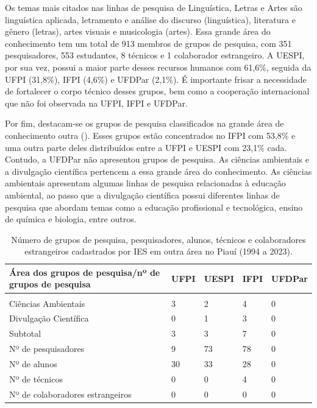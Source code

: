 \documentclass[portuguese]{textolivre}
\begin{document}
Os temas mais citados nas linhas de pesquisa de Linguística, Letras e Artes são linguística aplicada, letramento e análise do discurso (linguística), literatura e gênero (letras), artes visuais e musicologia (artes). Essa grande área do conhecimento tem um total de 913 membros de grupos de pesquisa, com 351 pesquisadores, 553 estudantes, 8 técnicos e 1 colaborador estrangeiro. A UESPI, por sua vez, possui a maior parte desses recursos humanos com 61,6\%, seguida da UFPI (31,8\%), IFPI (4,6\%) e UFDPar (2,1\%). É importante frisar a necessidade de fortalecer o corpo técnico desses grupos, bem como a cooperação internacional que não foi observada na UFPI, IFPI e UFDPar.

Por fim, destacam-se os grupos de pesquisa classificados na grande área de conhecimento outra (). Esses grupos estão concentrados no IFPI com 53,8\% e uma outra parte deles distribuídos entre a UFPI e UESPI com 23,1\% cada. Contudo, a UFDPar não apresentou grupos de pesquisa. As ciências ambientais e a divulgação científica pertencem a essa grande área do conhecimento. As ciências ambientais apresentam algumas linhas de pesquisa relacionadas à educação ambiental, ao passo que a divulgação científica possui diferentes linhas de pesquisa que abordam temas como a educação profissional e tecnológica, ensino de química e biologia, entre outros.

\begin{table}[htbp]
\centering
\begin{threeparttable}
\caption{Número de grupos de pesquisa, pesquisadores, alunos, técnicos e colaboradores estrangeiros cadastrados por IES em outra área no Piauí (1994 a 2023).}
\label{tbl12}
\begin{tabular}{>{\raggedright\arraybackslash}p{5cm} l l l l}
\toprule
Área dos grupos de pesquisa/nº de grupos de pesquisa & UFPI & UESPI & IFPI & UFDPar \\ 
\midrule
\multicolumn{5}{c}{Outra} \\
\midrule
Ciências Ambientais & 3 & 2 & 4 & 0 \\
Divulgação Científica & 0 & 1 & 3 & 0 \\
\midrule
Subtotal & 3 & 3 & 7 & 0 \\
\midrule
Nº de pesquisadores & 9 & 73 & 78 & 0 \\
Nº de alunos & 30 & 33 & 28 & 0 \\
Nº de técnicos & 0 & 0 & 4 & 0 \\
Nº de colaboradores estrangeiros & 0 & 0 & 0 & 0 \\
\bottomrule
\end{tabular}
\end{threeparttable}
\end{table}
\end{document}
